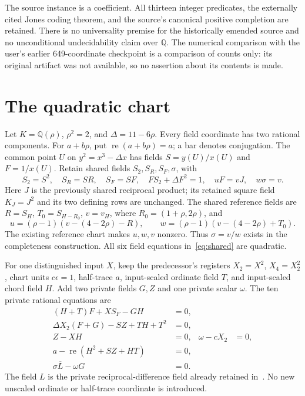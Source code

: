 \documentclass[11pt]{article}
\newcommand{\Q}{\mathbb Q}\newcommand{\Z}{\mathbb Z}
\newcommand{\re}{\operatorname{re}}
\begin{document}
The source instance is a coefficient. All thirteen integer predicates,
the externally cited Jones coding theorem, and the source's canonical
positive completion are retained. There is no universality premise for
the historically emended source and no unconditional undecidability
claim over \(\Q\). The numerical comparison with the user's earlier
649-coordinate checkpoint is a comparison of counts only: its original
artifact was not available, so no assertion about its contents is made.

\section{The quadratic chart}

Let \(K=\Q(\rho)\), \(\rho^2=2\), and \(\Delta=11-6\rho\).
Every field coordinate has two rational components. For
\(a+b\rho\), put \(\re(a+b\rho)=a\); a bar denotes conjugation.
The common point \(U\) on \(y^2=x^3-\Delta x\) has fields
\(S=y(U)/x(U)\) and \(F=1/x(U)\). Retain shared fields
\(S_2,S_R,S_F,\sigma\), with
\begin{equation}\label{eq:shared}
 S_2=S^2,\quad S_R=SR,\quad S_F=SF,\quad
 FS_2+\Delta F^2=1,\quad uF=vJ,\quad w\sigma=v.
\end{equation}
Here \(J\) is the previously shared reciprocal product; its retained
square field \(K_J=J^2\) and its two defining rows are unchanged.
The shared reference fields are \(R=S_H\), \(T_0=S_{H-R_0}\), \(v=v_H\),
where \(R_0=(1+\rho,2\rho)\), and
\[
 u=(\rho-1)(v-(4-2\rho)-R),\qquad
 w=(\rho-1)(v-(4-2\rho)+T_0).
\]
The existing reference chart makes \(u,w,v\) nonzero. Thus
\(\sigma=v/w\) exists in the completeness construction. All six
field equations in~\eqref{eq:shared} are quadratic.

For one distinguished input \(X\), keep the predecessor's registers
\(X_2=X^2\), \(X_4=X_2^2\), chart units \(c\epsilon=1\),
half-trace \(a\), input-scaled ordinate field \(T\), and input-scaled
chord field \(H\). Add two private fields \(G,Z\) and one private
scalar \(\omega\). The ten private rational equations are
\begin{align}
 (H+T)F+XS_F-GH&=0, \label{eq:Aquad}\\
 \Delta X_2(F+G)-SZ+TH+T^2&=0, \label{eq:Bquad}\\
 Z-XH&=0, & \omega-cX_2&=0, \label{eq:Zweight}\\
 a-\re(H^2+SZ+HT)&=0, \label{eq:trace}\\
 \sigma\overline L-\omega G&=0. \label{eq:L}
\end{align}
The field \(L\) is the private reciprocal-difference field already
retained in~\cite{common}. No new unscaled ordinate or half-trace
coordinate is introduced.
\end{document}
